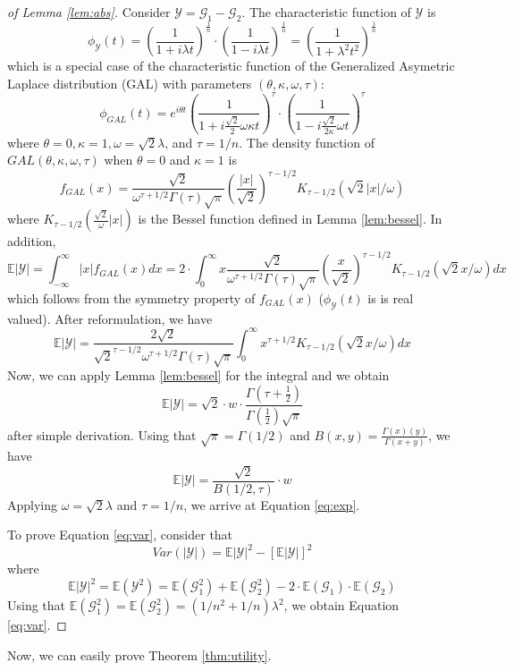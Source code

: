 \documentclass[11pt,a4paper]{article}
\theoremstyle{plain}
\theoremstyle{plain}
\theoremstyle{plain}
\theoremstyle{plain}
\theoremstyle{nonumberplain} \theoremseparator{}
\newtheorem{proof}{Proof}
\begin{document}
\begin{proof}[of Lemma \ref{lem:abs}]
Consider $\mathcal{Y} = \mathcal{G}_{1} - \mathcal{G}_{2}$. The characteristic function of $\mathcal{Y}$ is
$$
\phi_{\mathcal{Y}}(t) = \left(\frac{1}{1+i\lambda t}\right)^{\frac{1}{n}} \cdot \left(\frac{1}{1-i\lambda t}\right)^{\frac{1}{n}} = \left(\frac{1}{1+\lambda^2 t^2}\right)^{\frac{1}{n}}
$$
which is a special case of the characteristic function of the Generalized Asymetric Laplace distribution (GAL) with parameters $(\theta, \kappa, \omega, \tau)$:
$$
\phi_{\mathit{GAL}}(t) = e^{i\theta t}  \left(\frac{1}{1+i\frac{\sqrt{2}}{2} \omega \kappa t}\right)^{\tau} \cdot \left(\frac{1}{1-i\frac{\sqrt{2}}{2 \kappa} \omega t}\right)^{\tau}
$$
where $\theta = 0, \kappa = 1, \omega = \sqrt{2}\lambda$, and $\tau = 1/n$.
The density function of $GAL(\theta, \kappa, \omega, \tau)$ when $\theta = 0$ and $\kappa = 1$ is
$$
f_{\mathit{GAL}}(x) = \frac{\sqrt{2}}{ \omega^{\tau+1/2} \Gamma(\tau)\sqrt{\pi}} \left( \frac{|x|}{\sqrt{2}}  \right)^{\tau-1/2} K_{\tau-1/2}(\sqrt{2}|x|/\omega)
$$
where $K_{\tau-1/2}(\frac{\sqrt{2}}{\omega}|x|)$ is the Bessel function defined in Lemma \ref{lem:bessel}.
In addition,
$$
\mathbb{E}|\mathcal{Y}| = \int_{-\infty}^{\infty} |x| f_{\mathit{GAL}}(x) dx= 2 \cdot \int_{0}^{\infty} x   \frac{\sqrt{2}}{ \omega^{\tau+1/2} \Gamma(\tau)\sqrt{\pi}} \left( \frac{x}{\sqrt{2}}  \right)^{\tau-1/2} K_{\tau-1/2}(\sqrt{2}x/\omega) dx
$$
which follows from the symmetry property of $f_{\mathit{GAL}}(x)$ ($\phi_{\mathcal{Y}}(t)$ is is real valued). After reformulation, we have
$$
\mathbb{E}|\mathcal{Y}| =  \frac{2\sqrt{2}}{ \sqrt{2}^{\tau-1/2} \omega^{\tau+1/2} \Gamma(\tau)\sqrt{\pi}} \int_{0}^{\infty} x^{\tau+1/2} K_{\tau-1/2}(\sqrt{2}x/\omega) dx
$$
Now, we can apply Lemma \ref{lem:bessel} for the integral and we obtain 
$$
\mathbb{E}|\mathcal{Y}| =  \sqrt{2}\cdot w \cdot \frac{\Gamma(\tau+\frac{1}{2})}{\Gamma(\frac{1}{2})\sqrt{\pi}}  
$$
after simple derivation.
Using that $\sqrt{\pi} = \Gamma(1/2)$ and $B(x,y) = \frac{\Gamma(x)(y)}{\Gamma(x+y)}$, we have
$$
\mathbb{E}|\mathcal{Y}| =  \frac{\sqrt{2}}{B(1/2, \tau)}\cdot w
$$
Applying $\omega = \sqrt{2}\lambda$ and $\tau = 1/n$, we arrive at
Equation \eqref{eq:exp}.

To prove Equation \eqref{eq:var}, consider that
$$
\mathit{Var}(|\mathcal{Y}|) = \mathbb{E}|\mathcal{Y}|^2 - [\mathbb{E}|\mathcal{Y}|]^2
$$
where 
$$ 
\mathbb{E}|\mathcal{Y}|^2 = \mathbb{E}(\mathcal{Y}^2) = \mathbb{E}(\mathcal{G}_{1}^2) + \mathbb{E}(\mathcal{G}_{2}^2) - 2 \cdot \mathbb{E}(\mathcal{G}_{1}) \cdot \mathbb{E}(\mathcal{G}_{2})
$$
Using that $\mathbb{E}(\mathcal{G}_
{1}^2) = \mathbb{E}(\mathcal{G}_{2}^2) = (1/n^2 + 1/n)\lambda^2$,   
we obtain Equation \eqref{eq:var}.

\end{proof}
Now, we can easily prove Theorem \ref{thm:utility}.
\end{document}
